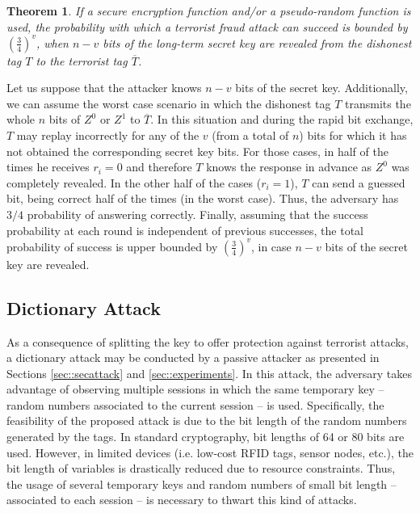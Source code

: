 \documentclass{article}
\newtheorem{theorem}{Theorem}\newtheorem{proposition}[theorem]{Proposition}
\newenvironment{proof}[1][Proof]{\begin{trivlist}
\item[\hskip \labelsep {\bfseries #1}]}{\end{trivlist}}
\begin{document}
\begin{theorem}\label{th::terrorist}
If a secure encryption function and/or a pseudo-random function is used, the probability with which a terrorist fraud attack can succeed is bounded by $(\frac{3}{4})^v$, when $n-v$ bits of the long-term secret key are revealed from the dishonest tag $T$ to the terrorist tag $\overline{T}$.
\end{theorem}

\begin{proof}
Let us suppose that the attacker knows  $n-v$ bits of the secret key. Additionally, we can assume the worst case scenario in which the dishonest tag $T$ transmits the whole $n$ bits of $Z^0$ or $Z^1$ to $\overline{T}$. In this situation and during the rapid bit exchange, $T$ may replay incorrectly  for any of the $v$ (from a total of $n$)  bits for which it has not obtained the corresponding secret key bits. For those cases,  in half of the times he receives $r_i=0$ and therefore $T$ knows the response in advance as $Z^0$ was completely revealed.  In the other half of the cases ($r_i=1$), $T$ can send a guessed bit, being correct half of the times (in the worst case). Thus, the adversary has $3/4$ probability of answering correctly. Finally, assuming that the success probability at each round is independent of previous successes, the total probability of success is upper bounded by $(\frac{3}{4})^v$, in case $n-v$ bits of the secret key are revealed. \end{proof}

\subsection{Dictionary Attack}
As a consequence of splitting the key to offer protection against terrorist attacks, a dictionary attack may be conducted by a passive attacker as presented in Sections \ref{sec::secattack} and \ref{sec::experiments}.  In this attack, the adversary takes advantage of observing multiple sessions in which the same temporary key -- random numbers associated to the current session -- is used.  Specifically, the feasibility of the proposed attack is due to the bit length of the random numbers generated by the tags.  In standard cryptography, bit lengths of 64 or 80 bits are used. However, in limited devices (i.e. low-cost RFID tags, sensor nodes, etc.), the bit length of variables is drastically reduced due to resource constraints. Thus, the usage of several temporary keys and random numbers of small bit length -- associated to each session -- is necessary to thwart this kind of attacks.
\end{document}
